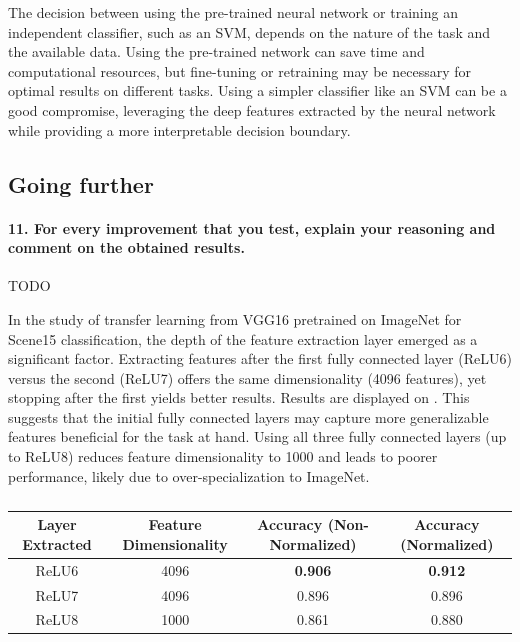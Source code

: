The decision between using the pre-trained neural network or training an independent classifier, such as an SVM, depends on the nature of the task and the available data. Using the pre-trained network can save time and computational resources, but fine-tuning or retraining may be necessary for optimal results on different tasks. Using a simpler classifier like an SVM can be a good compromise, leveraging the deep features extracted by the neural network while providing a more interpretable decision boundary.

\subsection{Going further}
\paragraph*{11. For every improvement that you test, explain your reasoning and comment on the obtained results.}
TODO

In the study of transfer learning from VGG16 pretrained on ImageNet for Scene15 classification, the depth of the feature extraction layer emerged as a significant factor. Extracting features after the first fully connected layer (ReLU6) versus the second (ReLU7) offers the same dimensionality (4096 features), yet stopping after the first yields better results. Results are displayed on . This suggests that the initial fully connected layers may capture more generalizable features beneficial for the task at hand. Using all three fully connected layers (up to ReLU8) reduces feature dimensionality to 1000 and leads to poorer performance, likely due to over-specialization to ImageNet. 

\begin{table}[H]
    \centering
    \begin{tabular}{@{}cccc@{}}
        \toprule
        \textbf{Layer Extracted} & \textbf{Feature Dimensionality} & \textbf{Accuracy (Non-Normalized)} & \textbf{Accuracy (Normalized)} \\
        \midrule \midrule
        ReLU6 & 4096            & \textbf{0.906}         & \textbf{0.912} \\
        ReLU7 & 4096            & 0.896                  & 0.896          \\
        ReLU8 & 1000            & 0.861                  & 0.880          \\
        \bottomrule
    \end{tabular}
    \caption{}
    \label{tab:depth_influence}
\end{table}

